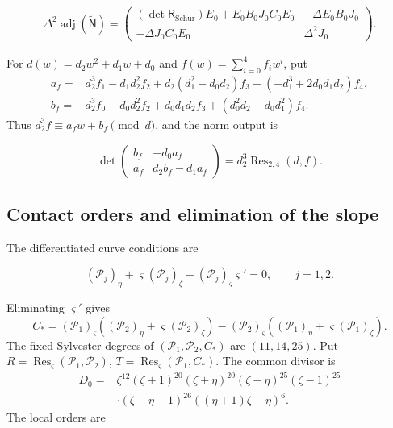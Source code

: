 \begin{align}
 \Delta^2\operatorname{adj}(\widetilde{\mathsf N})
 =\begin{pmatrix}
 (\det\mathsf R_{\mathrm{Schur}})E_0+E_0B_0J_0C_0E_0&-\Delta E_0B_0J_0\\
 -\Delta J_0C_0E_0&\Delta^2J_0
 \end{pmatrix}.
 \label{supp:r3schur:fulladj}
\end{align}

For $d(w)=d_2w^2+d_1w+d_0$ and
$f(w)=\sum_{i=0}^4f_iw^i$, put
\begin{align*}
 a_f={}&d_2^3f_1-d_1d_2^2f_2+d_2(d_1^2-d_0d_2)f_3
          +(-d_1^3+2d_0d_1d_2)f_4,\\
 b_f={}&d_2^3f_0-d_0d_2^2f_2+d_0d_1d_2f_3
          +(d_0^2d_2-d_0d_1^2)f_4.
\end{align*}
Thus $d_2^3f\equiv a_fw+b_f\pmod d$, and the norm output is

\begin{equation}
 \det\begin{pmatrix} b_f&-d_0 a_f\\
                      a_f&d_2 b_f-d_1 a_f\end{pmatrix}
 =d_2^3\operatorname{Res}_{2,4}(d,f).
 \label{supp:r3schur:normidentity}
\end{equation}

\subsection{Contact orders and elimination of the slope}

The differentiated curve conditions are

\begin{equation}\label{supp:r3:curve-differentiation}
 (\mathcal P_j)_\eta+\varsigma(\mathcal P_j)_\zeta
       +(\mathcal P_j)_\varsigma\varsigma'=0,
       \qquad j=1,2.
\end{equation}

Eliminating $\varsigma'$ gives
\[
 C_*=(\mathcal P_1)_\varsigma
       ((\mathcal P_2)_\eta+\varsigma(\mathcal P_2)_\zeta)
     -(\mathcal P_2)_\varsigma
       ((\mathcal P_1)_\eta+\varsigma(\mathcal P_1)_\zeta).
\]
The fixed Sylvester degrees of
$(\mathcal P_1,\mathcal P_2,C_*)$ are $(11,14,25)$. Put
$R=\operatorname{Res}_\varsigma(\mathcal P_1,\mathcal P_2)$,
$T=\operatorname{Res}_\varsigma(\mathcal P_1,C_*)$. The common divisor is
\[
\begin{aligned}
 D_0={}&\zeta^{12}(\zeta+1)^{20}(\zeta+\eta)^{20}
       (\zeta-\eta)^{25}(\zeta-1)^{25}\\
 &\cdot(\zeta-\eta-1)^{26}((\eta+1)\zeta-\eta)^6.
\end{aligned}
\]
The local orders are

